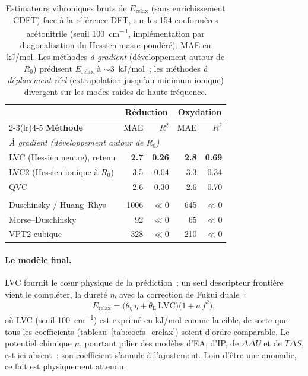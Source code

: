 \begin{table}[H]
\centering
\caption{Estimateurs vibroniques bruts de $E_{\text{relax}}$ (sans enrichissement CDFT) face à la référence DFT, sur les 154 conformères acétonitrile (seuil \SI{100}{cm^{-1}}, implémentation par diagonalisation du Hessien masse-pondéré). MAE en kJ/mol. Les méthodes \emph{à gradient} (développement autour de $R_0$) prédisent $E_{\text{relax}}$ à $\sim$\SI{3}{kJ/mol}~; les méthodes \emph{à déplacement réel} (extrapolation jusqu'au minimum ionique) divergent sur les modes raides de haute fréquence.}
\label{tab:vibronic_methods}
\footnotesize
\begin{tabular}{l r r r r}
\toprule
 & \multicolumn{2}{c}{\textbf{Réduction}} & \multicolumn{2}{c}{\textbf{Oxydation}} \\
\cmidrule(lr){2-3}\cmidrule(lr){4-5}
\textbf{Méthode} & {MAE} & {$R^2$} & {MAE} & {$R^2$} \\
\midrule
\multicolumn{5}{l}{\emph{À gradient (développement autour de $R_0$)}} \\
\quad LVC (Hessien neutre), retenu & \textbf{2.7} & \textbf{0.26} & \textbf{2.8} & \textbf{0.69} \\
\quad LVC2 (Hessien ionique à $R_0$)           & 3.5  & -0.04 & 3.3  & 0.34 \\
\quad QVC                                       & 2.6  & 0.30  & 2.6  & 0.70 \\
\addlinespace
\multicolumn{5}{l}{\emph{À déplacement réel (jusqu'au minimum ionique)}} \\
\quad Duschinsky / Huang--Rhys                  & 1006 & $\ll 0$ & 645 & $\ll 0$ \\
\quad Morse--Duschinsky                         & 92   & $\ll 0$ & 65  & $\ll 0$ \\
\quad VPT2-cubique                              & 328  & $\ll 0$ & 210 & $\ll 0$ \\
\bottomrule
\end{tabular}
\end{table}

\paragraph{Le modèle final.}
LVC fournit le cœur physique de la prédiction~; un seul descripteur frontière vient le compléter, la dureté $\eta$, avec la correction de Fukui duale~:
\begin{equation}
E_{\text{relax}} = \big(\theta_\eta\,\eta + \theta_{\text{L}}\,\text{LVC}\big)\big(1 + a\,f^2\big),
\label{eq:model_erelax}
\end{equation}
où LVC (seuil \SI{100}{cm^{-1}}) est exprimé en kJ/mol comme la cible, de sorte que tous les coefficients (tableau~\ref{tab:coefs_erelax}) soient d'ordre comparable. Le potentiel chimique $\mu$, pourtant pilier des modèles d'EA, d'IP, de $\Delta\Delta U$ et de $T\Delta S$, est ici absent~: son coefficient s'annule à l'ajustement. Loin d'être une anomalie, ce fait est physiquement attendu.

